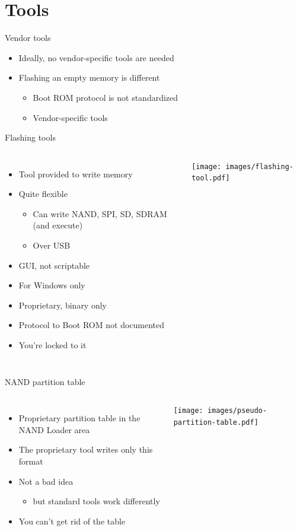 \documentclass[xetex,table,aspectratio=169]{beamer}
\begin{document}
\section{Tools}

\begin{frame}{Vendor tools}
  \begin{itemize}
  \item Ideally, no vendor-specific tools are needed
  \item Flashing an empty memory is different
    \begin{itemize}
    \item Boot ROM protocol is not standardized
    \item Vendor-specific tools
    \end{itemize}
  \end{itemize}
\end{frame}

\begin{frame}{Flashing tools}
  \begin{columns}
    \begin{itemize}
    \item Tool provided to write memory
    \item Quite flexible
      \begin{itemize}
      \item Can write NAND, SPI, SD, SDRAM (and execute)
      \item Over USB
      \end{itemize}
    \item GUI, not scriptable
    \item For Windows only
    \item Proprietary, binary only
    \item Protocol to Boot ROM not documented
    \item[\textrightarrow] You're locked to it
    \end{itemize}
  \texttt{[image: images/flashing-tool.pdf]}
  \end{columns}
\end{frame}

\begin{frame}{NAND partition table}
  \begin{columns}
    \begin{itemize}
    \item Proprietary partition table in the NAND Loader area
    \item The proprietary tool writes only this format
    \item Not a bad idea
      \begin{itemize}
        \item but standard tools work differently
    \end{itemize}
    \item[\textrightarrow] You can't get rid of the table
    \end{itemize}
    \texttt{[image: images/pseudo-partition-table.pdf]}
  \end{columns}
\end{frame}
\end{document}

